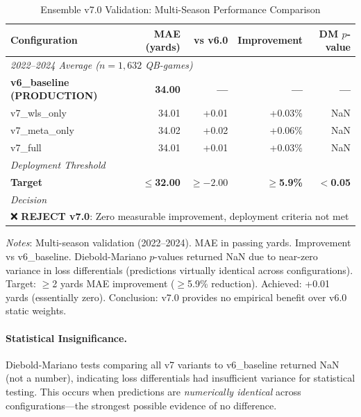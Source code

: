 \begin{table}[htbp]
  \centering
  \caption{Ensemble v7.0 Validation: Multi-Season Performance Comparison}
  \label{tab:ensemble-v7-validation-results}
  \begin{tabular}{lrrrr}
    \toprule
    \textbf{Configuration} & \textbf{MAE (yards)} & \textbf{vs v6.0} & \textbf{Improvement} & \textbf{DM $p$-value} \\
    \midrule
    \multicolumn{5}{l}{\textit{2022--2024 Average ($n=1{,}632$ QB-games)}} \\
    \rowcolor{lightgray}
    \textbf{v6\_baseline (PRODUCTION)} & \textbf{34.00} & \textbf{---} & \textbf{---} & \textbf{---} \\
    v7\_wls\_only & 34.01 & +0.01 & +0.03\% & NaN \\
    v7\_meta\_only & 34.02 & +0.02 & +0.06\% & NaN \\
    v7\_full & 34.01 & +0.01 & +0.03\% & NaN \\
    \midrule
    \multicolumn{5}{l}{\textit{Deployment Threshold}} \\
    \textbf{Target} & \textbf{$\le$32.00} & \textbf{$\ge-2.00$} & \textbf{$\ge$5.9\%} & \textbf{$<$0.05} \\
    \midrule
    \multicolumn{5}{l}{\textit{Decision}} \\
    \multicolumn{5}{l}{❌ \textbf{REJECT v7.0}: Zero measurable improvement, deployment criteria not met} \\
    \bottomrule
  \end{tabular}
  \vspace{0.5em}
  \begin{flushleft}
    \footnotesize\textit{Notes}: Multi-season validation (2022--2024). MAE in passing yards. Improvement vs v6\_baseline. Diebold-Mariano $p$-values returned NaN due to near-zero variance in loss differentials (predictions virtually identical across configurations). Target: $\ge$2 yards MAE improvement ($\ge$5.9\% reduction). Achieved: +0.01 yards (essentially zero). Conclusion: v7.0 provides no empirical benefit over v6.0 static weights.
  \end{flushleft}
\end{table}

\paragraph{Statistical Insignificance.}
Diebold-Mariano tests comparing all v7 variants to v6\_baseline returned NaN (not a number), indicating loss differentials had insufficient variance for statistical testing. This occurs when predictions are \textit{numerically identical} across configurations---the strongest possible evidence of no difference.

